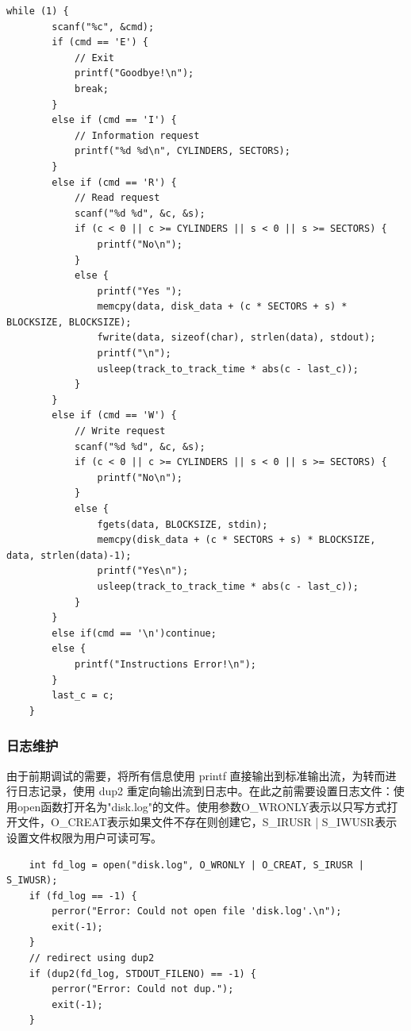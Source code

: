 \documentclass{article}
\begin{document}
\begin{lstlisting}
while (1) {
        scanf("%c", &cmd);
        if (cmd == 'E') {
            // Exit
            printf("Goodbye!\n");
            break;
        }
        else if (cmd == 'I') {
            // Information request
            printf("%d %d\n", CYLINDERS, SECTORS);
        } 
        else if (cmd == 'R') {
            // Read request
            scanf("%d %d", &c, &s);
            if (c < 0 || c >= CYLINDERS || s < 0 || s >= SECTORS) {
                printf("No\n");
            } 
            else {
                printf("Yes ");
                memcpy(data, disk_data + (c * SECTORS + s) * BLOCKSIZE, BLOCKSIZE);
                fwrite(data, sizeof(char), strlen(data), stdout);
                printf("\n");
                usleep(track_to_track_time * abs(c - last_c));
            }
        }
        else if (cmd == 'W') {
            // Write request
            scanf("%d %d", &c, &s);
            if (c < 0 || c >= CYLINDERS || s < 0 || s >= SECTORS) {
                printf("No\n");
            }
            else {
                fgets(data, BLOCKSIZE, stdin);
                memcpy(disk_data + (c * SECTORS + s) * BLOCKSIZE, data, strlen(data)-1);
                printf("Yes\n");
                usleep(track_to_track_time * abs(c - last_c));
            }
        }
        else if(cmd == '\n')continue;
        else {
            printf("Instructions Error!\n");
        }
        last_c = c;
    }
\end{lstlisting}

\subsubsection{日志维护}

由于前期调试的需要，将所有信息使用 printf 直接输出到标准输出流，为转而进行日志记录，使用 dup2 重定向输出流到日志中。在此之前需要设置日志文件：使用open函数打开名为"disk.log"的文件。使用参数O\_WRONLY表示以只写方式打开文件，O\_CREAT表示如果文件不存在则创建它，S\_IRUSR | S\_IWUSR表示设置文件权限为用户可读可写。

\begin{lstlisting}
	int fd_log = open("disk.log", O_WRONLY | O_CREAT, S_IRUSR | S_IWUSR);
    if (fd_log == -1) {
        perror("Error: Could not open file 'disk.log'.\n");
        exit(-1);
    }
    // redirect using dup2
    if (dup2(fd_log, STDOUT_FILENO) == -1) {
        perror("Error: Could not dup.");
        exit(-1);
    }
\end{lstlisting}
\end{document}
